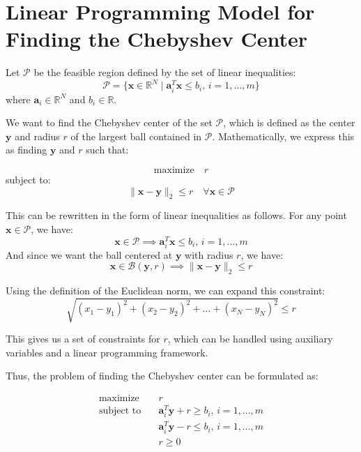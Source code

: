 \documentclass{article}
\begin{document}
\section*{Linear Programming Model for Finding the Chebyshev Center}

Let $\mathcal{P}$ be the feasible region defined by the set of linear inequalities:
\[
\mathcal{P} = \{ \mathbf{x} \in \mathbb{R}^N \mid \mathbf{a}_i^T \mathbf{x} \leq b_i, \, i = 1, \ldots, m \}
\]
where $\mathbf{a}_i \in \mathbb{R}^N$ and $b_i \in \mathbb{R}$.

We want to find the Chebyshev center of the set $\mathcal{P}$, which is defined as the center $\mathbf{y}$ and radius $r$ of the largest ball contained in $\mathcal{P}$. Mathematically, we express this as finding $\mathbf{y}$ and $r$ such that:

\[
\text{maximize} \quad r
\]
subject to:
\[
\|\mathbf{x} - \mathbf{y}\|_2 \leq r \quad \forall \mathbf{x} \in \mathcal{P}
\]

This can be rewritten in the form of linear inequalities as follows. For any point $\mathbf{x} \in \mathcal{P}$, we have:
\[
\mathbf{x} \in \mathcal{P} \implies \mathbf{a}_i^T \mathbf{x} \leq b_i, \, i = 1, \ldots, m
\]
And since we want the ball centered at $\mathbf{y}$ with radius $r$, we have:
\[
\mathbf{x} \in \mathcal{B}(\mathbf{y}, r) \implies \|\mathbf{x} - \mathbf{y}\|_2 \leq r
\]

Using the definition of the Euclidean norm, we can expand this constraint:
\[
\sqrt{(x_1 - y_1)^2 + (x_2 - y_2)^2 + \ldots + (x_N - y_N)^2} \leq r
\]

This gives us a set of constraints for $r$, which can be handled using auxiliary variables and a linear programming framework.

Thus, the problem of finding the Chebyshev center can be formulated as:

\begin{align*}
\text{maximize} \quad & r \\
\text{subject to} \quad & \mathbf{a}_i^T \mathbf{y} + r \geq b_i, \, i = 1, \ldots, m \\
& \mathbf{a}_i^T \mathbf{y} - r \leq b_i, \, i = 1, \ldots, m \\
& r \geq 0
\end{align*}
\end{document}
